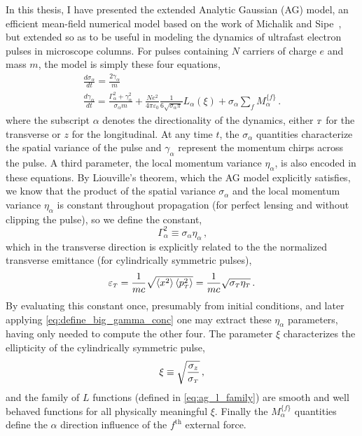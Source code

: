 In this thesis, I have presented the extended Analytic Gaussian (AG) model, an efficient mean-field numerical model based on the work of Michalik and Sipe~\cite{michalik_analytic_2006}, but extended so as to be useful in modeling the dynamics of ultrafast electron pulses in microscope columns.
For pulses containing $N$ carriers of charge $e$ and mass $m$, the model is simply these four equations,
\begin{subequations}
\begin{gather}
  \frac{d\sigma_{\alpha}}{dt} = \frac{2\gamma_{\alpha}}{m} \\
  \frac{d\gamma_{\alpha}}{dt} = \frac{ \Gamma_{\alpha}^2 + \gamma_{\alpha}^2 }{\sigma_{\alpha} m}
    + \frac{N e^2}{4\pi\varepsilon_0} \frac{1}{6 \sqrt{\sigma_{\alpha}\pi}} L_{\alpha}(\xi) + \sigma_{\alpha} \sum\limits_{f} M_{\alpha}^{\lbrace f \rbrace} \label{eq:ag_model_gamma_conc} \,\text{.}
\end{gather}
\end{subequations}
where the subscript $\alpha$ denotes the directionality of the dynamics, either ${\scriptscriptstyle T}$ for the transverse or $z$ for the longitudinal.
At any time $t$, the $\sigma_{\alpha}$ quantities characterize the spatial variance of the pulse and $\gamma_{\alpha}$ represent the momentum chirps across the pulse.
A third parameter, the local momentum variance $\eta_{\alpha}$, is also encoded in these equations.
By Liouville's theorem, which the AG model explicitly satisfies, we know that the product of the spatial variance $\sigma_{\alpha}$ and the local momentum variance $\eta_{\alpha}$ is constant throughout propagation (for perfect lensing and without clipping the pulse), so we define the constant,
\begin{equation} \label{eq:define_big_gamma_conc}
  \Gamma_{\alpha}^2 \equiv \sigma_{\alpha} \eta_{\alpha} \,\text{,}
\end{equation}
which in the transverse direction is explicitly related to the the normalized transverse emittance (for cylindrically symmetric pulses),
\begin{equation}
  \varepsilon_{{\scriptscriptstyle T}} = \frac{1}{m c} \sqrt{ \left < x^2 \right > \left < p_{{\scriptscriptstyle T}}^2 \right > } = \frac{1}{m c} \sqrt{ \sigma_{{\scriptscriptstyle T}} \eta_{{\scriptscriptstyle T}} } \,\text{.}
\end{equation}
By evaluating this constant once, presumably from initial conditions, and later applying \ref{eq:define_big_gamma_conc} one may extract these $\eta_{\alpha}$ parameters, having only needed to compute the other four.
The parameter $\xi$ characterizes the ellipticity of the cylindrically symmetric pulse,
\begin{equation}
  \xi \equiv \sqrt{\dfrac{\sigma_{z}}{\sigma_{{\scriptscriptstyle T}}}} \,\text{,}
\end{equation}
and the family of $L$ functions (defined in \ref{eq:ag_l_family}) are smooth and well behaved functions for all physically meaningful $\xi$.
Finally the $M_{\alpha}^{\lbrace f \rbrace}$ quantities define the $\alpha$ direction influence of the $f^{\text{th}}$ external force.

